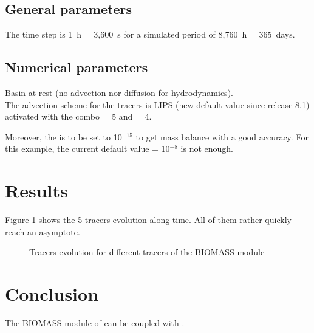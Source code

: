 \subsection{General parameters}

The time step is 1~h = 3,600~s for a simulated period of 8,760~h = 365~days.

\subsection{Numerical parameters}

Basin at rest (no advection nor diffusion for hydrodynamics).\\

The advection scheme for the tracers is LIPS (new default value since release 8.1) activated
with the combo  = 5
and  = 4.

Moreover, the  is to be set to 10$^{-15}$ to
get mass balance with a good accuracy.
For this example, the current default value = 10$^{-8}$ is not enough.

\section{Results}

Figure \ref{fig:waq3d_biomas:res} shows the 5 tracers evolution along time.
All of them rather quickly reach an asymptote.

\begin{figure} [H]
\centering
{}
 \caption{Tracers evolution for different tracers of the BIOMASS module}
 \label{fig:waq3d_biomas:res}
\end{figure}

\section{Conclusion}

The BIOMASS module of \waqtel can be coupled with .
